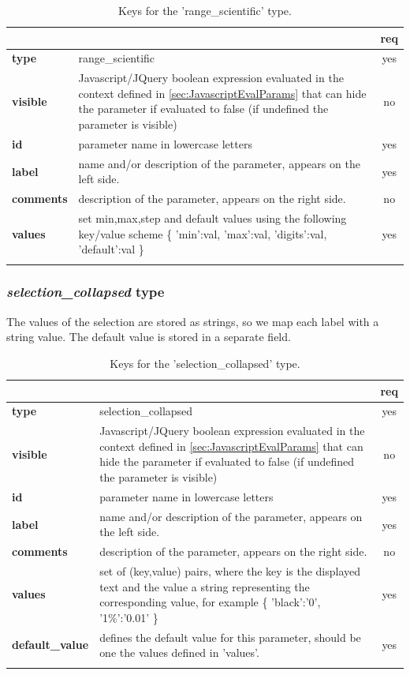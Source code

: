 \begin{longtable}{|>{\bf}L{\linewidth}|L{\linewidth}|c|}
\hline
      &  & {\bf req} 
\tabularnewline \hline \hline
 type  & range\_scientific       & yes \\ \hline
 visible  & Javascript/JQuery boolean expression evaluated in the context defined 
              in \ref{sec:JavascriptEvalParams} that can hide the parameter if
            evaluated to false (if undefined the parameter is visible)& no \\ \hline
 id     & parameter name in lowercase letters  & yes \\ \hline
 label  & name and/or description of the parameter, appears on the left side. & yes
                      \\ \hline
 comments & description of the parameter, appears on the right side. & no
                      \\ \hline
 values & set min,max,step and default values using the following key/value 
scheme \{ 'min':val, 'max':val, 'digits':val, 'default':val \} & yes
                      \\ \hline
\caption{Keys for the 'range\_scientific' type.}
\end{longtable}


\subsubsection{ \emph{selection\_collapsed} type}

The values of the selection are stored as strings, so we map each label with a 
string value. The default value is stored in a separate field.

\begin{longtable}{|>{\bf}L{\linewidth}|L{\linewidth}|c|}
\hline
      &  & {\bf req} 
\tabularnewline \hline \hline
 type  & selection\_collapsed    & yes \\ \hline
 visible  & Javascript/JQuery boolean expression evaluated in the context defined 
              in \ref{sec:JavascriptEvalParams} that can hide the parameter if
            evaluated to false (if undefined the parameter is visible)& no \\ \hline
 id     & parameter name in lowercase letters & yes \\ \hline
 label  & name and/or description of the parameter, appears on the left side. & yes
                      \\ \hline
 comments & description of the parameter, appears on the right side. & no
                      \\ \hline
 values & set of (key,value) pairs, where the key is the displayed text and the 
value a string representing the corresponding value, for example \{ 
'black':'0', '1\%':'0.01' \} & yes
                      \\ \hline
 default\_value & defines the default value for this parameter, should be one 
the values defined in 'values'. & yes \\ \hline
\caption{Keys for the 'selection\_collapsed' type.}
\end{longtable}

